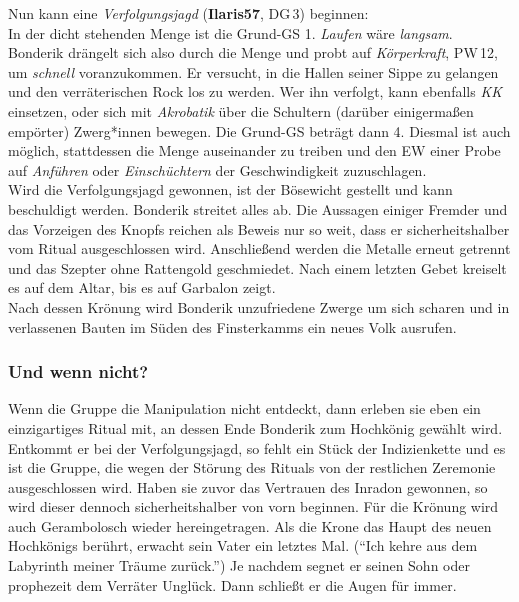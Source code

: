 Nun kann eine \emph{Verfolgungsjagd} (\textbf{Ilaris57}, DG\,3) beginnen:\\
In der dicht stehenden Menge ist die Grund-GS 1. \emph{Laufen} wäre \emph{langsam}.
Bonderik drängelt sich also durch die Menge und probt auf \emph{Körperkraft}, PW\,12, um \emph{schnell} voranzukommen. Er versucht, in die Hallen seiner Sippe zu gelangen und den verräterischen Rock los zu werden.
Wer ihn verfolgt, kann ebenfalls \emph{KK} einsetzen, oder sich mit \emph{Akrobatik} über die Schultern (darüber einigermaßen empörter) Zwerg*innen bewegen. Die Grund-GS beträgt dann 4. Diesmal ist auch möglich, stattdessen die Menge auseinander zu treiben und den EW einer Probe auf \emph{Anführen} oder \emph{Einschüchtern} der Geschwindigkeit zuzuschlagen.\\
Wird die Verfolgungsjagd gewonnen, ist der Bösewicht gestellt und kann beschuldigt werden.
Bonderik streitet alles ab. Die Aussagen einiger Fremder und das Vorzeigen des Knopfs reichen als Beweis nur so weit, dass er sicherheitshalber vom Ritual ausgeschlossen wird. Anschließend werden die Metalle erneut getrennt und das Szepter ohne Rattengold geschmiedet. Nach einem letzten Gebet kreiselt es auf dem Altar, bis es auf Garbalon zeigt.\\
Nach dessen Krönung wird Bonderik unzufriedene Zwerge um sich scharen und in verlassenen Bauten im Süden des Finsterkamms ein neues Volk ausrufen.
\subsubsection{Und wenn nicht?}
Wenn die Gruppe die Manipulation nicht entdeckt, dann erleben sie eben ein einzigartiges Ritual mit, an dessen Ende Bonderik zum Hochkönig gewählt wird.
Entkommt er bei der Verfolgungsjagd, so fehlt ein Stück der Indizienkette und es ist die Gruppe, die wegen der Störung des Rituals von der restlichen Zeremonie ausgeschlossen wird.
Haben sie zuvor das Vertrauen des Inradon gewonnen, so wird dieser dennoch sicherheitshalber von vorn beginnen.
Für die Krönung wird auch Gerambolosch wieder hereingetragen. Als die Krone das Haupt des neuen Hochkönigs berührt, erwacht sein Vater ein letztes Mal. (\enquote{Ich kehre aus dem Labyrinth meiner Träume zurück.}) Je nachdem segnet er seinen Sohn oder prophezeit dem Verräter Unglück.
Dann schließt er die Augen für immer.

